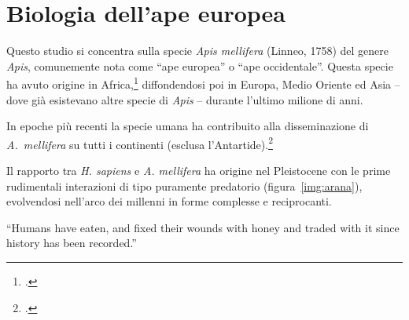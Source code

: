 \chapter{Biologia dell'ape europea}
\label{chap:bio}
Questo studio si concentra sulla specie \emph{Apis mellifera} (Linneo, 1758) del genere \emph{Apis},
comunemente nota come ``ape europea'' o ``ape occidentale''.
Questa specie ha avuto origine in Africa,\footcite{origins}
diffondendosi poi in Europa, Medio Oriente ed Asia -- dove già esistevano altre specie di \emph{Apis} --
durante l'ultimo milione di anni.

In epoche più recenti la specie umana ha contribuito alla disseminazione di \emph{A.~mellifera} su tutti i continenti
(esclusa l'Antartide).\footcite{origins,honeyreligion}

Il rapporto tra \emph{H. sapiens} e \emph{A. mellifera} ha origine nel Pleistocene con le prime rudimentali interazioni
di tipo puramente predatorio (figura~\ref{img:arana}), evolvendosi nell'arco dei millenni in forme complesse e reciprocanti.

\begin{displayquote}
``Humans have eaten, and fixed their wounds with honey and traded with it since history has been recorded.''
\end{displayquote}

